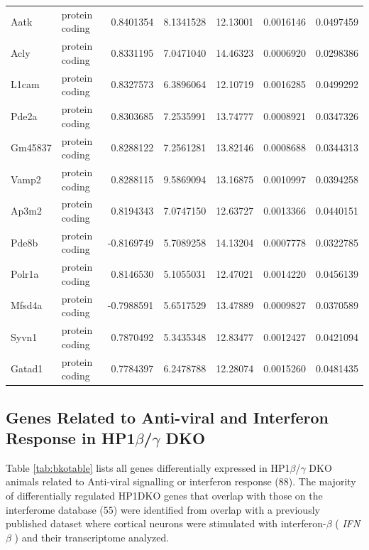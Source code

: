 \documentclass[onehalf,12pt]{beavtex}
\begin{document}
\begin{longtable}{llrrrrr}
  Aatk & protein coding & 0.8401354 & 8.1341528 & 12.13001 & 0.0016146 & 0.0497459\\
  Acly & protein coding & 0.8331195 & 7.0471040 & 14.46323 & 0.0006920 & 0.0298386\\
  L1cam & protein coding & 0.8327573 & 6.3896064 & 12.10719 & 0.0016285 & 0.0499292\\
  \addlinespace
  Pde2a & protein coding & 0.8303685 & 7.2535991 & 13.74777 & 0.0008921 & 0.0347326\\
  Gm45837 & protein coding & 0.8288122 & 7.2561281 & 13.82146 & 0.0008688 & 0.0344313\\
  Vamp2 & protein coding & 0.8288115 & 9.5869094 & 13.16875 & 0.0010997 & 0.0394258\\
  Ap3m2 & protein coding & 0.8194343 & 7.0747150 & 12.63727 & 0.0013366 & 0.0440151\\
  Pde8b & protein coding & -0.8169749 & 5.7089258 & 14.13204 & 0.0007778 & 0.0322785\\
  \addlinespace
  Polr1a & protein coding & 0.8146530 & 5.1055031 & 12.47021 & 0.0014220 & 0.0456139\\
  Mfsd4a & protein coding & -0.7988591 & 5.6517529 & 13.47889 & 0.0009827 & 0.0370589\\
  Syvn1 & protein coding & 0.7870492 & 5.3435348 & 12.83477 & 0.0012427 & 0.0421094\\
  Gatad1 & protein coding & 0.7784397 & 6.2478788 & 12.28074 & 0.0015260 & 0.0481435\\*
  \end{longtable}
  
  \endgroup{}
  
  \clearpage
  
  \subsection{\texorpdfstring{Genes Related to Anti-viral and Interferon
  Response in HP1\(\beta\)/\(\gamma\)
  DKO}{Genes Related to Anti-viral and Interferon Response in HP1\textbackslash{}beta/\textbackslash{}gamma DKO}}\label{inflam}
  
  Table \ref{tab:bkotable} lists all genes differentially expressed in
  HP1\(\beta\)/\(\gamma\) DKO animals related to Anti-viral signalling or
  interferon response (88). The majority of differentially regulated
  HP1DKO genes that overlap with those on the interferome database (55)
  were identified from overlap with a previously published dataset where
  cortical neurons were stimulated with interferon-\(\beta\) (
  \emph{IFN\(\beta\)} ) and their transcriptome analyzed.
  
\end{document}
